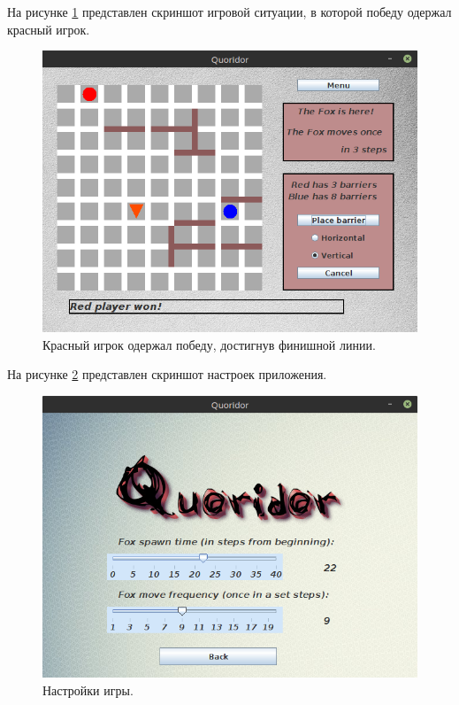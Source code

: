 \documentclass[a4paper]{article}
\begin{document}
На рисунке \ref{pic:gameGUI3} представлен скриншот игровой ситуации, в которой победу одержал красный игрок.

\begin{figure}[H]
	\begin{center}
		\includegraphics[scale=0.48]{gameGUI3}
		\caption{Красный игрок одержал победу, достигнув финишной линии.} 
		\label{pic:gameGUI3} %
	\end{center}
\end{figure}

На рисунке \ref{pic:gameSettings} представлен скриншот настроек приложения.
\begin{figure}[H]
	\begin{center}
		\includegraphics[scale=0.48]{gameSettings}
		\caption{Настройки игры.} 
		\label{pic:gameSettings} %
	\end{center}
\end{figure}
\end{document}

